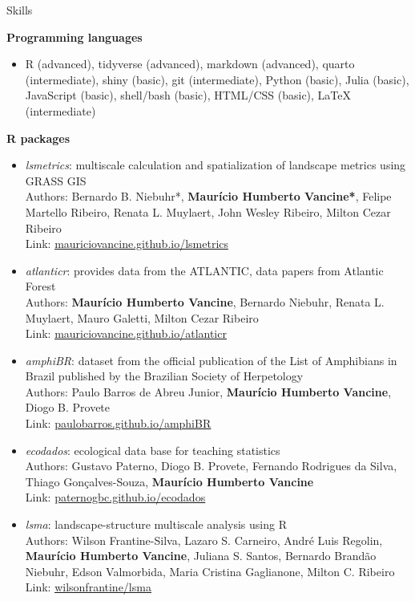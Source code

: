 \documentclass{resume}
\begin{document}
\begin{rSection}{Skills}

{\bf Programming languages}
\begin{itemize}
\item R (advanced), tidyverse (advanced), markdown (advanced), quarto (intermediate), shiny (basic), git (intermediate), Python (basic), Julia (basic), JavaScript (basic), shell/bash (basic), HTML/CSS (basic), LaTeX (intermediate)
\end{itemize}

{\bf R packages}
\begin{itemize} 
\item {\it lsmetrics}: multiscale calculation and spatialization of landscape metrics using GRASS GIS\\
Authors: Bernardo B. Niebuhr*, {\bf Maurício Humberto Vancine*}, Felipe Martello Ribeiro, Renata L. Muylaert, John Wesley Ribeiro, Milton Cezar Ribeiro\\
Link: \href{https://mauriciovancine.github.io/lsmetrics}{\underline{mauriciovancine.github.io/lsmetrics}}

\item {\it atlanticr}: provides data from the ATLANTIC, data papers from Atlantic Forest\\
Authors: {\bf Maurício Humberto Vancine}, Bernardo Niebuhr, Renata L. Muylaert, Mauro Galetti, Milton Cezar Ribeiro\\
Link: \href{https://mauriciovancine.github.io/atlanticr}{\underline{mauriciovancine.github.io/atlanticr}}

\item {\it amphiBR}: dataset from the official publication of the List of Amphibians in Brazil published by the Brazilian Society of Herpetology\\
Authors: Paulo Barros de Abreu Junior, {\bf Maurício Humberto Vancine}, Diogo B. Provete\\
Link: \href{https://paulobarros.github.io/amphiBR}{\underline{paulobarros.github.io/amphiBR}}

\item {\it ecodados}: ecological data base for teaching statistics\\
Authors: Gustavo Paterno, Diogo B. Provete, Fernando Rodrigues da Silva, Thiago Gonçalves-Souza, {\bf Maurício Humberto Vancine}\\
Link: \href{https://paternogbc.github.io/ecodados/}{\underline{paternogbc.github.io/ecodados}}

\item {\it lsma}: landscape-structure multiscale analysis using R\\
Authors: Wilson Frantine-Silva, Lazaro S. Carneiro, André Luis Regolin, {\bf Maurício Humberto Vancine}, Juliana S. Santos, Bernardo Brandão Niebuhr, Edson Valmorbida, Maria Cristina Gaglianone, Milton C. Ribeiro\\
Link: \href{https://github.com/wilsonfrantine/landscapeDecoupler}{\underline{wilsonfrantine/lsma}}


\end{itemize}
\end{rSection}
\end{document}
